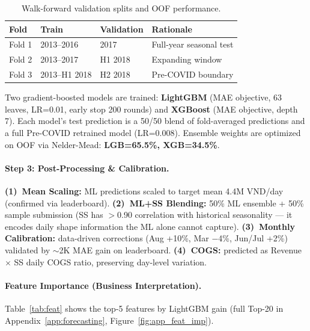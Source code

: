 \documentclass{article}
\begin{document}
\vspace{-2pt}
\begin{table}[htbp]
  \caption{Walk-forward validation splits and OOF performance.}
  \label{tab:cv}
  \centering
  \small
  \begin{tabular}{@{}llll@{}}
    \toprule
    \textbf{Fold} & \textbf{Train} & \textbf{Validation} & \textbf{Rationale} \\
    \midrule
    Fold 1 & 2013--2016 & 2017 & Full-year seasonal test \\
    Fold 2 & 2013--2017 & H1 2018 & Expanding window \\
    Fold 3 & 2013--H1 2018 & H2 2018 & Pre-COVID boundary \\
    \bottomrule
  \end{tabular}
\end{table}
\vspace{-2pt}

Two gradient-boosted models are trained: \textbf{LightGBM} (MAE objective, 63 leaves, LR=0.01, early stop 200 rounds) and \textbf{XGBoost} (MAE objective, depth 7). Each model's test prediction is a 50/50 blend of fold-averaged predictions and a full Pre-COVID retrained model (LR=0.008). Ensemble weights are optimized on OOF via Nelder-Mead: \textbf{LGB=65.5\%, XGB=34.5\%}.

\paragraph{Step 3: Post-Processing \& Calibration.}
\textbf{(1)~Mean Scaling:} ML predictions scaled to target mean 4.4M VND/day (confirmed via leaderboard).
\textbf{(2)~ML+SS Blending:} 50\% ML ensemble + 50\% sample submission (SS has $>$0.90 correlation with historical seasonality — it encodes daily shape information the ML alone cannot capture).
\textbf{(3)~Monthly Calibration:} data-driven corrections (Aug +10\%, Mar $-$4\%, Jun/Jul +2\%) validated by $\sim$2K MAE gain on leaderboard.
\textbf{(4)~COGS:} predicted as Revenue $\times$ SS daily COGS ratio, preserving day-level variation.

\paragraph{Feature Importance (Business Interpretation).}
Table~\ref{tab:feat} shows the top-5 features by LightGBM gain (full Top-20 in Appendix~\ref{app:forecasting}, Figure~\ref{fig:app_feat_imp}).
\end{document}
